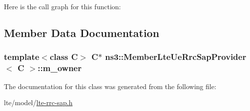Here is the call graph for this function\+:




\subsection{Member Data Documentation}
\subsubsection[{\texorpdfstring{m\+\_\+owner}{m_owner}}]{\setlength{\rightskip}{0pt plus 5cm}template$<$class C$>$ {\bf C}$\ast$ {\bf ns3\+::\+Member\+Lte\+Ue\+Rrc\+Sap\+Provider}$<$ {\bf C} $>$\+::m\+\_\+owner\hspace{0.3cm}{\ttfamily [private]}}\hypertarget{classns3_1_1MemberLteUeRrcSapProvider_a6653ae762edde1378aa04bb43f04764a}{}\label{classns3_1_1MemberLteUeRrcSapProvider_a6653ae762edde1378aa04bb43f04764a}


The documentation for this class was generated from the following file\+:\begin{DoxyCompactItemize}
\item 
lte/model/\hyperlink{lte-rrc-sap_8h}{lte-\/rrc-\/sap.\+h}\end{DoxyCompactItemize}
